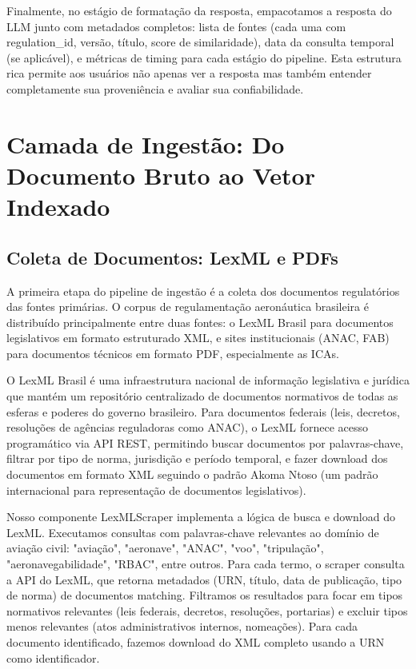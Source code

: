 \documentclass[12pt,a4paper]{article}
\begin{document}
Finalmente, no estágio de formatação da resposta, empacotamos a resposta do LLM junto com metadados completos: lista de fontes (cada uma com regulation\_id, versão, título, score de similaridade), data da consulta temporal (se aplicável), e métricas de timing para cada estágio do pipeline. Esta estrutura rica permite aos usuários não apenas ver a resposta mas também entender completamente sua proveniência e avaliar sua confiabilidade.

\section{Camada de Ingestão: Do Documento Bruto ao Vetor Indexado}

\subsection{Coleta de Documentos: LexML e PDFs}

A primeira etapa do pipeline de ingestão é a coleta dos documentos regulatórios das fontes primárias. O corpus de regulamentação aeronáutica brasileira é distribuído principalmente entre duas fontes: o LexML Brasil para documentos legislativos em formato estruturado XML, e sites institucionais (ANAC, FAB) para documentos técnicos em formato PDF, especialmente as ICAs.

O LexML Brasil é uma infraestrutura nacional de informação legislativa e jurídica que mantém um repositório centralizado de documentos normativos de todas as esferas e poderes do governo brasileiro. Para documentos federais (leis, decretos, resoluções de agências reguladoras como ANAC), o LexML fornece acesso programático via API REST, permitindo buscar documentos por palavras-chave, filtrar por tipo de norma, jurisdição e período temporal, e fazer download dos documentos em formato XML seguindo o padrão Akoma Ntoso (um padrão internacional para representação de documentos legislativos).

Nosso componente LexMLScraper implementa a lógica de busca e download do LexML. Executamos consultas com palavras-chave relevantes ao domínio de aviação civil: "aviação", "aeronave", "ANAC", "voo", "tripulação", "aeronavegabilidade", "RBAC", entre outros. Para cada termo, o scraper consulta a API do LexML, que retorna metadados (URN, título, data de publicação, tipo de norma) de documentos matching. Filtramos os resultados para focar em tipos normativos relevantes (leis federais, decretos, resoluções, portarias) e excluir tipos menos relevantes (atos administrativos internos, nomeações). Para cada documento identificado, fazemos download do XML completo usando a URN como identificador.
\end{document}
